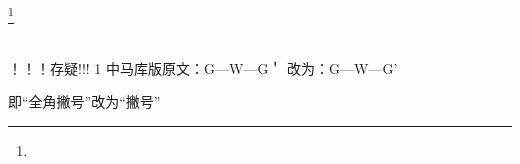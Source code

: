 \footnote{}

\texttt{}

\textbf{}



\part{}

\chapter{}

    \section{}

        \subsection{}

            \subsubsection{}

                \paragraph{}


\uppercase\expandafter{\romannumeral}


\thispagestyle{empty}
\clearpage


！！！存疑!!!
    1
        中马库版原文：G—W—G＇
        改为：G—W—G'

        即“全角撇号”改为“撇号”




